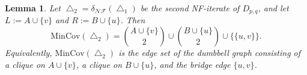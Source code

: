 \documentclass[10pt,a4paper]{amsart}
\newtheorem{lemma}{Lemma}
\newcommand{\MIN}{\mathrm{MinCov}}
\begin{document}
		\begin{lemma}\label{lem:mincov-Delta2}
			Let \(\bigtriangleup_2=\delta_{\mathcal{NF}}(\bigtriangleup_1)\) be the second NF-iterate of \(D_{p,q}\), and
			let \(L:=A\cup\{v\}\) and \(R:=B\cup\{u\}\). 
			Then 
			\[
			\MIN(\bigtriangleup_2)=\binom{A\cup\{v\}}{2} \cup \binom{B\cup\{u\}}{2} \cup \{\{u,v\}\}.
			\]
			Equivalently, \(\MIN(\bigtriangleup_2)\) is the edge set of the dumbbell graph consisting of a clique on \(A\cup\{v\}\),
			a clique on \(B\cup\{u\}\), and the bridge edge \(\{u,v\}\).
		\end{lemma}
\end{document}
